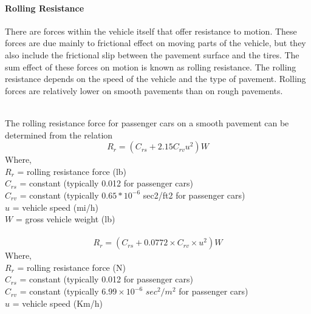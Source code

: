 \paragraph{Rolling Resistance}
There are forces within the vehicle itself that offer resistance to motion. These forces are due mainly to frictional effect on moving parts of the vehicle, but they also include the frictional slip between the pavement surface and the tires. The sum effect of these forces on motion is known as rolling resistance. The rolling resistance depends on the speed of the vehicle and the type of pavement. Rolling forces are relatively lower on smooth pavements than on rough pavements.\\\\
\par
The rolling resistance force for passenger cars on a smooth pavement can be determined from the relation
\begin{equation}
	R_r = (C_{rs} + 2.15C_{rv} u^2)W
\end{equation}
Where,\\
\hspace*{10mm}$R_r$ = rolling resistance force (lb)\\
\hspace*{10mm}$C_{rs}$ = constant (typically 0.012 for passenger cars)\\
\hspace*{10mm}$C_{rv}$ = constant (typically $0.65 * 10^{-6}$ sec2/ft2 for passenger cars)\\
\hspace*{10mm}$u$ = vehicle speed (mi/h)\\
\hspace*{10mm}$W$ = gross vehicle weight (lb)\\\\
\begin{equation}
	R_r = ( C_{rs} + 0.0772 \times C_{rv} \times u^2)W
\end{equation}
Where,\\
\hspace*{10mm}$R_r$ = rolling resistance force (N)\\
\hspace*{10mm}$C_{rs}$ = constant (typically 0.012 for passenger cars)\\
\hspace*{10mm}$C_{rv}$ = constant (typically $6.99 \times 10^{-6}$ $ sec^2/m^2 $ for passenger cars)\\
\hspace*{10mm}$u$ = vehicle speed (Km/h)\\
